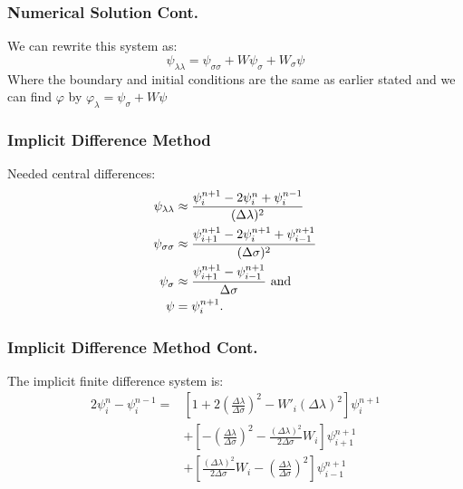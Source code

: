 \documentclass[xcolor=dvipsnames]{beamer}
\begin{document}
\begin{frame}
\frametitle{Numerical Solution Cont.}

We can rewrite this system as:
\[
\psi_{\lambda \lambda}=\psi_{\sigma\sigma}+W\psi_{\sigma}+W_\sigma\psi
\]
Where the boundary and initial conditions are the same as earlier stated and we can find $\varphi$ by $\varphi_\lambda = \psi_\sigma+W\psi$ 
\end{frame}

\begin{frame}
\frametitle{Implicit Difference Method}
Needed central differences:\\
\begin{align*}%
\psi_{\lambda \lambda}&\approx \frac{\psi^{n+1}_i-2\psi^n_i+\psi^{n-1}_i}{(\Delta\lambda)^2}\\\vspace{3mm}
\psi_{\sigma\sigma}&\approx \frac{\psi^{n+1}_{i+1}-2\psi^{n+1}_i+\psi^{n+1}_{i-1}}{(\Delta\sigma)^2}\\\vspace{3mm}
\psi_\sigma&\approx \frac{\psi^{n+1}_{i+1}-\psi^{n+1}_{i-1}}{\Delta\sigma}\text{ and}\\\vspace{3mm}
\psi&=\psi^{n+1}_i.\\
\end{align*}
\end{frame}


\begin{frame}
\frametitle{Implicit Difference Method Cont.}
The implicit finite difference system is:
\begin{align*}
2\psi^{n}_i-\psi^{n-1}_i=&[1+2(\frac{\Delta\lambda}{\Delta\sigma})^2-W'_i(\Delta\lambda)^2]\psi^{n+1}_{i}\\
													 &+[-(\frac{\Delta\lambda}{\Delta\sigma})^2-\frac{(\Delta\lambda)^2}{2\Delta\sigma}W_i]\psi^{n+1}_{i+1}\\
													 &+[\frac{(\Delta\lambda)^2}{2\Delta\sigma} W_i-(\frac{\Delta\lambda}{\Delta\sigma})^2]\psi^{n+1}_{i-1}\\
\end{align*}
\end{frame}
\end{document}

